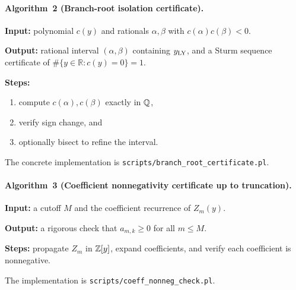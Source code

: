 \paragraph{Algorithm~2 (Branch-root isolation certificate).}
\textbf{Input:} polynomial \(c(y)\) and rationals \(\alpha,\beta\) with \(c(\alpha)c(\beta)<0\).\par
\textbf{Output:} rational interval \((\alpha,\beta)\) containing \(y_{\mathrm{LY}}\), and a Sturm sequence certificate of \(\#\{y\in\mathbb R:c(y)=0\}=1\).\par
\textbf{Steps:}
\begin{enumerate}
  \item compute \(c(\alpha),c(\beta)\) exactly in \(\mathbb{Q}\),
  \item verify sign change, and
  \item optionally bisect to refine the interval.
\end{enumerate}
The concrete implementation is
\texttt{scripts/branch\_root\_certificate.pl}.

\paragraph{Algorithm~3 (Coefficient nonnegativity certificate up to truncation).}
\textbf{Input:} a cutoff \(M\) and the coefficient recurrence of \(Z_m(y)\).\par
\textbf{Output:} a rigorous check that \(a_{m,k}\ge0\) for all \(m\le M\).\par
\textbf{Steps:} propagate \(Z_m\) in \(\mathbb{Z}[y]\), expand coefficients, and verify each coefficient is nonnegative.\par
The implementation is
\texttt{scripts/coeff\_nonneg\_check.pl}.

